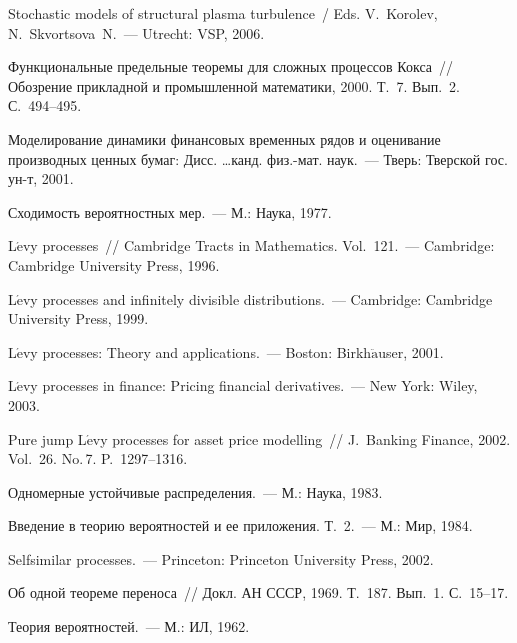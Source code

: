 \begin{multicols}{2}
{{\begin{thebibliography}{99}
Stochastic models of structural plasma turbulence~/
Eds. V.~Korolev, N.~Skvortsova~N.~--- Utrecht: VSP, 2006.

  Функциональные предельные
теоремы для сложных процессов Кокса~// Обозрение прикладной и
промышленной математики, 2000. Т.~7. Вып.~2. С.~494--495.

 Моделирование динамики
финансовых временных рядов и оценивание производных ценных бумаг:
Дисс. \ldots канд. физ.-мат. наук.~--- Тверь: Тверской гос.
ун-т, 2001.

  Сходимость вероятностных мер.~--- М.: Наука, 1977.

 L$\acute{\mbox{e}}$vy processes~// Cambridge Tracts in
Mathematics. Vol.~121.~--- Cambridge: Cambridge University Press, 1996.

  L$\acute{\mbox{e}}$vy processes and
infinitely divisible distributions.~--- Cambridge: Cambridge
University Press, 1999.

L$\acute{\mbox{e}}$vy processes: Theory and
applications.~--- Boston: Birkh$\ddot{\mbox{a}}$user, 2001.

  L$\acute{\mbox{e}}$vy processes in
finance: Pricing financial derivatives.~--- New York: Wiley, 2003.

  Pure jump L$\acute{\mbox{e}}$vy processes for
asset price modelling~// J.~Banking Finance, 2002. Vol.~26. No.\,7. P.~1297--1316.

  Одномерные устойчивые
распределения.~--- М.: Наука, 1983.

  Введение в теорию вероятностей и
ее приложения. Т.~2.~--- М.: Мир, 1984.

 
Selfsimilar processes.~--- Princeton: Princeton University Press, 2002.

 Об одной
теореме переноса~// Докл. АН СССР, 1969. Т.~187. Вып.~1. С.~15--17.


\label{end\stat}

 Теория вероятностей.~--- М.: ИЛ, 1962.
\end{thebibliography}
}
}

\end{multicols}